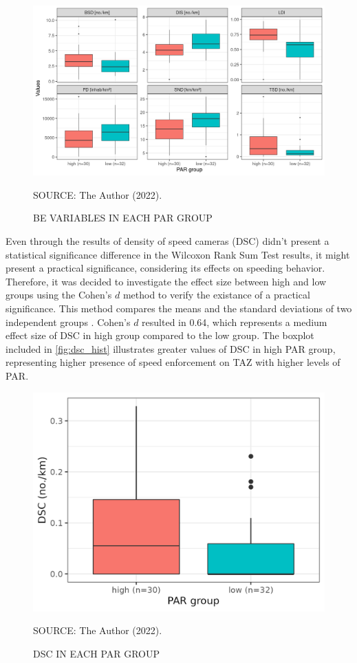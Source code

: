 \begin{figure}[!htbp]
    \footnotesize
    \captionsetup{font=footnotesize}
    \caption{BE VARIABLES IN EACH PAR GROUP}
    \centering
    \includegraphics{fig/par_hist.png}
    \label{fig:wilcox_par}
    \par SOURCE: The Author (2022).
\end{figure}

Even through the results of density of speed cameras (DSC) didn't present a statistical significance difference in the Wilcoxon Rank Sum Test results, it might present a practical significance, considering its effects on speeding behavior. Therefore, it was decided to investigate the effect size between high and low groups using the Cohen's $d$ method to verify the existance of a practical significance. This method compares the means and the standard deviations of two independent groups \cite{peetersPracticalSignificanceMoving2016}. Cohen's $d$  resulted in 0.64, which represents a medium effect size of DSC in high group compared to the low group. The boxplot included in \autoref{fig:dsc_hist} illustrates greater values of DSC in high PAR group, representing higher presence of speed enforcement on TAZ with higher levels of PAR.

\begin{figure}
    \footnotesize
    \captionsetup{font=footnotesize}
    \caption{DSC IN EACH PAR GROUP}
    \centering
    \includegraphics{fig/dsc_hist.png}
    \label{fig:dsc_hist}
    \par SOURCE: The Author (2022).
\end{figure}

